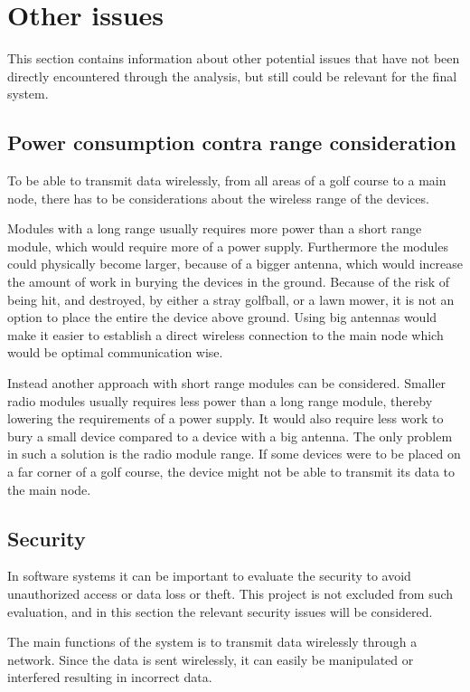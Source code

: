 \section{Other issues}
This section contains information about other potential issues that have not been directly encountered through the analysis, but still could be relevant for the final system.

\subsection{Power consumption contra range consideration} \label{cha:batcons}
To be able to transmit data wirelessly, from all areas of a golf course to a main node, there has to be considerations about the wireless range of the devices.

Modules with a long range usually requires more power than a short range module, which would require more of a power supply. Furthermore the modules could physically become larger, because of a bigger antenna, which would increase the amount of work in burying the devices in the ground. Because of the risk of being hit, and destroyed, by either a stray golfball, or a lawn mower, it is not an option to place the entire the device above ground. Using big antennas would make it easier to establish a direct wireless connection to the main node which would be optimal communication wise.

Instead another approach with short range modules can be considered. Smaller radio modules usually requires less power than a long range module, thereby lowering the requirements of a power supply. It would also require less work to bury a small device compared to a device with a big antenna. The only problem in such a solution is the radio module range. If some devices were to be placed on a far corner of a golf course, the device might not be able to transmit its data to the main node. 

\subsection{Security}
In software systems it can be important to evaluate the security to avoid unauthorized access or data loss or theft. This project is not excluded from such evaluation, and in this section the relevant security issues will be considered.

The main functions of the system is to transmit data wirelessly through a network. Since the data is sent wirelessly, it can easily be manipulated or interfered resulting in incorrect data.

